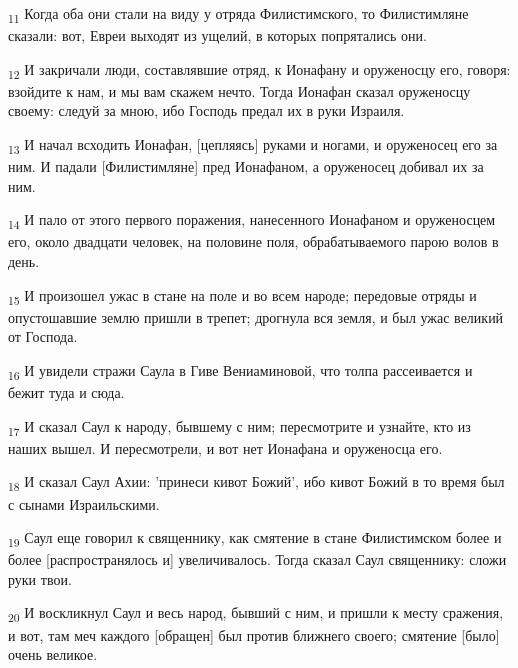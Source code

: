 \begin{tcolorbox}
\textsubscript{11} Когда оба они стали на виду у отряда Филистимского, то Филистимляне сказали: вот, Евреи выходят из ущелий, в которых попрятались они.
\end{tcolorbox}
\begin{tcolorbox}
\textsubscript{12} И закричали люди, составлявшие отряд, к Ионафану и оруженосцу его, говоря: взойдите к нам, и мы вам скажем нечто. Тогда Ионафан сказал оруженосцу своему: следуй за мною, ибо Господь предал их в руки Израиля.
\end{tcolorbox}
\begin{tcolorbox}
\textsubscript{13} И начал всходить Ионафан, [цепляясь] руками и ногами, и оруженосец его за ним. И падали [Филистимляне] пред Ионафаном, а оруженосец добивал их за ним.
\end{tcolorbox}
\begin{tcolorbox}
\textsubscript{14} И пало от этого первого поражения, нанесенного Ионафаном и оруженосцем его, около двадцати человек, на половине поля, обрабатываемого парою волов в день.
\end{tcolorbox}
\begin{tcolorbox}
\textsubscript{15} И произошел ужас в стане на поле и во всем народе; передовые отряды и опустошавшие землю пришли в трепет; дрогнула вся земля, и был ужас великий от Господа.
\end{tcolorbox}
\begin{tcolorbox}
\textsubscript{16} И увидели стражи Саула в Гиве Вениаминовой, что толпа рассеивается и бежит туда и сюда.
\end{tcolorbox}
\begin{tcolorbox}
\textsubscript{17} И сказал Саул к народу, бывшему с ним; пересмотрите и узнайте, кто из наших вышел. И пересмотрели, и вот нет Ионафана и оруженосца его.
\end{tcolorbox}
\begin{tcolorbox}
\textsubscript{18} И сказал Саул Ахии: 'принеси кивот Божий', ибо кивот Божий в то время был с сынами Израильскими.
\end{tcolorbox}
\begin{tcolorbox}
\textsubscript{19} Саул еще говорил к священнику, как смятение в стане Филистимском более и более [распространялось и] увеличивалось. Тогда сказал Саул священнику: сложи руки твои.
\end{tcolorbox}
\begin{tcolorbox}
\textsubscript{20} И воскликнул Саул и весь народ, бывший с ним, и пришли к месту сражения, и вот, там меч каждого [обращен] был против ближнего своего; смятение [было] очень великое.
\end{tcolorbox}
